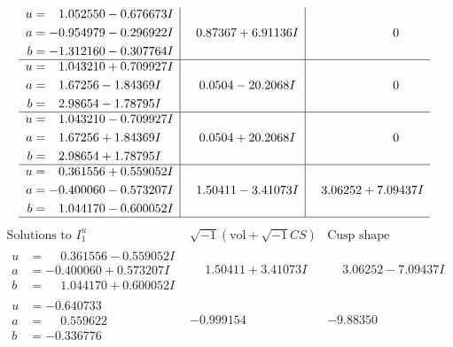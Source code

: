 \documentclass[1p]{elsarticle_modified}
\theoremstyle{definition}
\newcommand{\I}{\sqrt{-1}}
\begin{document}
$$\begin{array}{c|c|c}
\begin{aligned}
u &= \phantom{-}1.052550 - 0.676673 I \\
a &= -0.954979 - 0.296922 I \\
b &= -1.312160 - 0.307764 I\end{aligned}
 & \phantom{-}0.87367 + 6.91136 I & \phantom{-0.000000 } 0 \\ \hline\begin{aligned}
u &= \phantom{-}1.043210 + 0.709927 I \\
a &= \phantom{-}1.67256 - 1.84369 I \\
b &= \phantom{-}2.98654 - 1.78795 I\end{aligned}
 & \phantom{-}0.0504 - 20.2068 I & \phantom{-0.000000 } 0 \\ \hline\begin{aligned}
u &= \phantom{-}1.043210 - 0.709927 I \\
a &= \phantom{-}1.67256 + 1.84369 I \\
b &= \phantom{-}2.98654 + 1.78795 I\end{aligned}
 & \phantom{-}0.0504 + 20.2068 I & \phantom{-0.000000 } 0 \\ \hline\begin{aligned}
u &= \phantom{-}0.361556 + 0.559052 I \\
a &= -0.400060 - 0.573207 I \\
b &= \phantom{-}1.044170 - 0.600052 I\end{aligned}
 & \phantom{-}1.50411 - 3.41073 I & \phantom{-}3.06252 + 7.09437 I\\
 \hline 
 \end{array}$$\newpage$$\begin{array}{c|c|c}  
\text{Solutions to }I^u_{1}& \I (\text{vol} + \sqrt{-1}CS) & \text{Cusp shape}\\
 \hline 
\begin{aligned}
u &= \phantom{-}0.361556 - 0.559052 I \\
a &= -0.400060 + 0.573207 I \\
b &= \phantom{-}1.044170 + 0.600052 I\end{aligned}
 & \phantom{-}1.50411 + 3.41073 I & \phantom{-}3.06252 - 7.09437 I \\ \hline\begin{aligned}
u &= -0.640733\phantom{ +0.000000I} \\
a &= \phantom{-}0.559622\phantom{ +0.000000I} \\
b &= -0.336776\phantom{ +0.000000I}\end{aligned}
 & -0.999154\phantom{ +0.000000I} & -9.88350\phantom{ +0.000000I} \\ \hline\begin{aligned}

\end{aligned}
\end{array}$$
\end{document}
